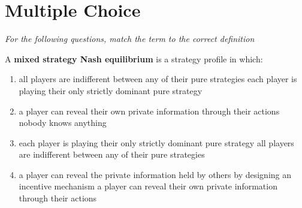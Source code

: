 \documentclass{article}
\begin{document}
\vspace{1.0in}


\vspace{0.5in}

\begin{center}
\end{center}

\newpage




\section*{Multiple Choice}


\textit{For the following questions, match the term to the correct definition}

\begin{question}[type=exam]{4}
  A \textbf{mixed strategy Nash equilibrium} is a strategy profile in which:
  \begin{enumerate}[label=\alph*), noitemsep]
    \item \vary
    {all players are indifferent between any of their pure strategies} %
    {each player is playing their only strictly dominant pure strategy}
    \item \vary
    {a player can reveal their own private information through their actions}
    {nobody knows anything}
    \item \vary
    {each player is playing their only strictly dominant pure strategy}
    {all players are indifferent between any of their pure strategies} %
    \item \vary
    {a player can reveal the private information held by others by designing an incentive mechanism}
    {a player can reveal their own private information through their actions}
  \end{enumerate}
\end{question}
\end{document}
